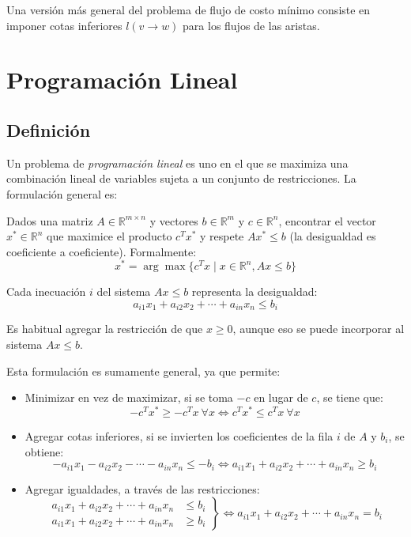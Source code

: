 \documentclass[a4paper]{report}
\newcommand{\R}{\mathbb{R}}
\begin{document}
Una versión más general del problema de flujo de costo mínimo consiste en imponer cotas inferiores $l(v \rightarrow w)$ para los flujos de las aristas.

\section{Programación Lineal}
\label{programacion-lineal}

\subsection{Definición}

Un problema de \textit{programación lineal} es uno en el que se maximiza una combinación lineal de variables sujeta a un conjunto de restricciones. La formulación general es:

\begin{problema}
    Dados una matriz $A \in \R^{m \times n}$ y vectores $b \in \R^m$ y $c \in \R^n$, encontrar el vector $x^* \in \R^n$ que maximice el producto $c^T x^*$ y respete $Ax^* \leq b$ (la desigualdad es coeficiente a coeficiente). Formalmente:
    $$x^* = \arg\max{\{c^T x \mid x \in \R^n, Ax \leq b\}}$$
\end{problema}

Cada inecuación $i$ del sistema $Ax \leq b$ representa la desigualdad:
$$a_{i1} x_1 + a_{i2} x_2 + \cdots + a_{in} x_n \leq b_i$$

Es habitual agregar la restricción de que $x \geq 0$, aunque eso se puede incorporar al sistema $Ax \leq b$.

Esta formulación es sumamente general, ya que permite:
\begin{itemize}
    \item Minimizar en vez de maximizar, si se toma $-c$ en lugar de $c$, se tiene que:
          $$-c^T x^* \geq -c^T x\ \forall x \iff c^T x^* \leq c^T x\ \forall x$$
    \item Agregar cotas inferiores, si se invierten los coeficientes de la fila $i$ de $A$ y $b_i$, se obtiene:
          $$-a_{i1} x_1 - a_{i2} x_2 - \cdots - a_{in} x_n \leq -b_i \iff a_{i1} x_1 + a_{i2} x_2 + \cdots + a_{in} x_n \geq b_i$$
    \item Agregar igualdades, a través de las restricciones:
          \begin{equation*}
              \left.\begin{aligned}
                  a_{i1} x_1 + a_{i2} x_2 + \cdots + a_{in} x_n & \leq b_i \\
                  a_{i1} x_1 + a_{i2} x_2 + \cdots + a_{in} x_n & \geq b_i
              \end{aligned}\right\} \iff a_{i1} x_1 + a_{i2} x_2 + \cdots + a_{in} x_n = b_i
          \end{equation*}
\end{itemize}
\end{document}
